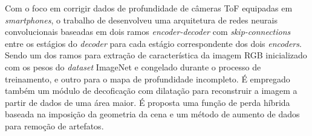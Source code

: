 Com o foco em corrigir dados de profundidade de câmeras ToF equipadas em \textit{smartphones}, o trabalho de  desenvolveu uma arquitetura de redes neurais convolucionais baseadas em dois ramos \textit{encoder-decoder} com \textit{skip-connections} entre os estágios do \textit{decoder} para cada estágio correspondente dos dois \textit{encoders}. Sendo um dos ramos para extração de característica da imagem RGB inicializado com os pesos do \textit{dataset} ImageNet e congelado durante o processo de treinamento, e outro para o mapa de profundidade incompleto. É empregado também um módulo de decoficação com dilatação para reconstruir a imagem a partir de dados de uma área maior. É proposta uma função de perda híbrida baseada na imposição da geometria da cena e um método de aumento de dados para remoção de artefatos.




